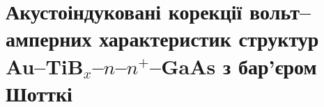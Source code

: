 %
%
%
%
%
%
%




%




\section{Акустоіндуковані корекції вольт--амперних характеристик структур Au--TiB$_x$--$n$--$n^+$--GaAs з бар'єром Шотткі\label{MSGA}}

